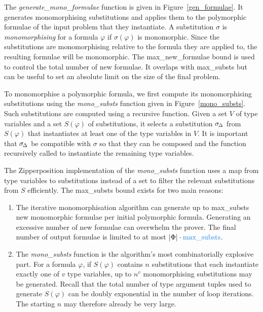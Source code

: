 \documentclass[runningheads]{llncs}
\begin{document}
The \emph{generate\_mono\_formulae} function is given in Figure~\ref{gen_formulae}.
It generates monomorphising substitutions and applies them to the polymorphic formulae of the input problem that they instantiate.
A substitution \(\sigma\) is \emph{monomorphising} for a formula \(\varphi\) if \(\sigma(\varphi)\) is monomorphic.
Since the substitutions are monomorphising relative to the formula they are applied to, the resulting formulae will be monomorphic. The \textcolor{ourblueviolet}{max\_new\_formulae} bound is used to control the total number of new formulae. It overlaps with \textcolor{ourblueviolet}{max\_substs} but can be useful to set an absolute limit on the size of the final problem.

To monomorphise a polymorphic formula, we first compute its {monomorphising substitutions} using the \emph{mono\_substs} function given in Figure~\ref{mono_substs}.
Such substitutions are computed using a recursive function. Given a set \(V\) of type variables and a set \(S(\varphi)\) of substitutions, it selects a substitution \(\sigma_{\kern-0.083333em\Delta}\) from \(S(\varphi)\) that instantiates at least one of the type variables in \(V\). It is important that \(\sigma_{\kern-0.083333em\Delta}\) be compatible with \(\sigma\) so that they can be composed and the function recursively called to instantiate the remaining type variables.

The Zipperposition implementation of the \emph{mono\_substs} function uses a map from type variables to substitutions instead of a set to filter the relevant substitutions from \(S\) efficiently. The \textcolor{ourblueviolet}{max\_substs} bound exists for two main reasons:
\begin{enumerate}
   \item The iterative monomorphisation algorithm can generate up to \textcolor{ourblueviolet}{max\_substs} new monomorphic formulae per initial polymorphic formula. Generating an excessive number of new formulae can overwhelm the prover. The final number of output formulae is limited to at most \(|\Phi|\cdot \text{\textcolor{ourblueviolet}{max\_substs}}\).
   \item The \emph{mono\_substs} function is the algorithm's most combinatorially explosive part. For a formula \(\varphi\), if \(S(\varphi)\) contains \(n\) substitutions that each instantiate exactly one of \(v\) %
type variables, up to \(n^v\) monomorphising substitutions may be generated. Recall that the total number of type argument tuples used to generate \(S(\varphi)\) can be doubly exponential in the number of loop iterations. The starting \(n\) may therefore already be very large.
\end{enumerate}
\end{document}
